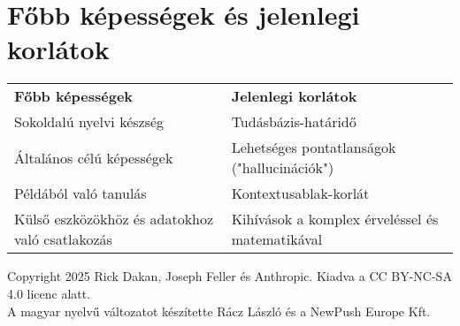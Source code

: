 \documentclass[a4paper, 11pt]{article}
\begin{document}
\section*{Főbb képességek és jelenlegi korlátok}
\begin{tabular}{p{} p{}}
\textbf{Főbb képességek} & \textbf{Jelenlegi korlátok} \\
Sokoldalú nyelvi készség & Tudásbázis-határidő \\
Általános célú képességek & Lehetséges pontatlanságok ("hallucinációk") \\
Példából való tanulás & Kontextusablak-korlát \\
\parbox[t]{0.45\textwidth}{Külső eszközökhöz és adatokhoz való csatlakozás} & \parbox[t]{0.45\textwidth}{Kihívások a komplex érveléssel és matematikával} \\
\end{tabular}

\vspace{\fill}
\begin{center}
    \small{Copyright 2025 Rick Dakan, Joseph Feller és Anthropic. Kiadva a CC BY-NC-SA 4.0 licenc alatt.\\A magyar nyelvű változatot készítette Rácz László és a NewPush Europe Kft.}
\end{center}
\end{document}
